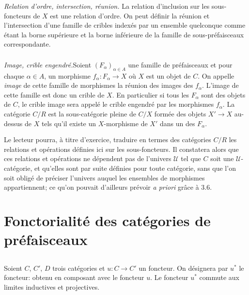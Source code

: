 \subsubsection{}
\emph{Relation d'ordre, intersection, réunion.} La relation
d'inclusion sur les sous-foncteurs de $X$ est une relation d'ordre.
On peut définir la réunion et l'intersection d'une famille de
cribles indexés par un ensemble quelconque comme étant la borne
supérieure et la borne inférieure de la famille de sous-préfaisceaux
correspondante.

\subsubsection{}
\emph{Image, crible engendré.}\pageoriginale Soient
$(F_\alpha)_{\alpha\in A}$ une famille de préfaisceaux et pour
chaque $\alpha\in A$, un morphisme $f_\alpha:F_\alpha\rightarrow X$
où $X$ est un objet de $C$. On appelle \emph{image} de cette famille
de morphismes la réunion des images des $f_\alpha$. L'image de cette
famille est donc un crible de $X$. En particulier si tous les
$F_\alpha$ sont des objets de $C$, le crible image sera appelé le
crible engendré par les morphismes $f_\alpha$. La catégorie $C/R$
est la sous-catégorie pleine de $C/X$ formée des objets
$X'\rightarrow X$ au-dessus de $X$ tels qu'il existe un
$X$-morphisme de $X'$ dans un des $F_{\alpha}$.

Le lecteur pourra, à titre d'exercice, traduire en termes des
catégories $C/R$ les relations et opérations définies ici sur les
sous-foncteurs. Il constatera alors que ces relations et opérations
ne dépendent pas de l'univers $𝒰$ tel que $C$ soit une
$𝒰$-catégorie, et qu'elles sont par suite définies pour
toute catégorie, sans que l'on soit obligé de préciser l'univers
auquel les ensembles de morphismes appartiennent; ce qu'on pouvait
d'ailleurs prévoir \textit{a priori} grâce à 3.6.

\section{Fonctorialité des catégories de préfaisceaux}

\setcounter{subsection}{-1}
\subsection{}
Soient $C$, $C'$, $D$ trois catégories et $u:C\rightarrow C'$ un
foncteur. On désignera par $u^\ast$ le foncteur:  obtenu en composant avec le foncteur $u$. Le foncteur
$u^\ast$ commute aux limites inductives et projectives.

